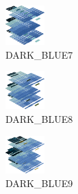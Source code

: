 \hspace{0.1cm}
\begin{minipage}[b]{0.15\linewidth}
\begin{figure}[H]                                                          
  \centering                                                             
  \begin{adjustbox}{width=1.5cm,center}                                   
  \includegraphics[width=1.5cm]{src/colorspace_colourflow/flows/colourflow_151-45.png}%
  \end{adjustbox}                                                        
\caption*{DARK\_BLUE7}                                           
\end{figure}                                                               
\end{minipage}
\hspace{0.1cm}
\begin{minipage}[b]{0.15\linewidth}
\begin{figure}[H]                                                          
  \centering                                                             
  \begin{adjustbox}{width=1.5cm,center}                                   
  \includegraphics[width=1.5cm]{src/colorspace_colourflow/flows/colourflow_152-45.png}%
  \end{adjustbox}                                                        
\caption*{DARK\_BLUE8}                                           
\end{figure}                                                               
\end{minipage}
\hspace{0.1cm}
\begin{minipage}[b]{0.15\linewidth}
\begin{figure}[H]                                                          
  \centering                                                             
  \begin{adjustbox}{width=1.5cm,center}                                   
  \includegraphics[width=1.5cm]{src/colorspace_colourflow/flows/colourflow_153-45.png}%
  \end{adjustbox}                                                        
\caption*{DARK\_BLUE9}                                           
\end{figure}                                                               
\end{minipage}
